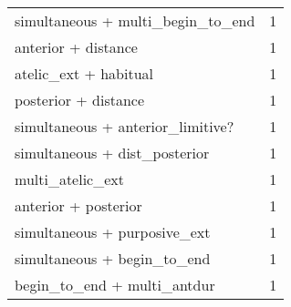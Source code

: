 \begin{table}[htbp!]
\begin{tabular}{lr}
simultaneous + multi\_begin\_to\_end         &         1 \\
anterior + distance                       &         1 \\
atelic\_ext + habitual                     &         1 \\
posterior + distance                      &         1 \\
simultaneous + anterior\_limitive?         &         1 \\
simultaneous + dist\_posterior             &         1 \\
multi\_atelic\_ext                          &         1 \\
anterior + posterior                      &         1 \\
simultaneous + purposive\_ext              &         1 \\
simultaneous + begin\_to\_end               &         1 \\
begin\_to\_end + multi\_antdur               &         1 \\
\bottomrule
\end{tabular}
\end{table}
